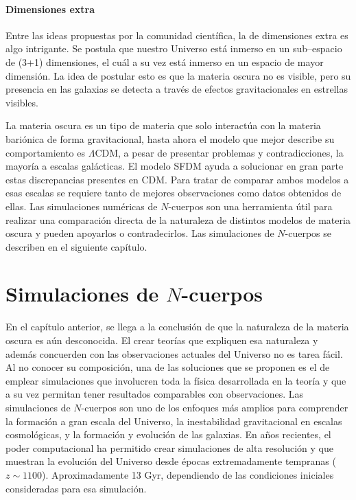 \documentclass[a4paper,openright,12pt]{book}
\begin{document}
\subsubsection*{Dimensiones extra}

Entre las ideas propuestas por la comunidad científica, la de dimensiones extra es algo intrigante. Se postula que nuestro Universo está inmerso en un sub--espacio de (3+1) dimensiones, el cuál a su vez está inmerso en un espacio de mayor dimensión. La idea de postular esto es que la materia oscura no es visible, pero su presencia en las galaxias se detecta a través de efectos gravitacionales en estrellas visibles.

La materia oscura es un tipo de materia que solo interactúa con la materia bariónica de forma gravitacional, hasta ahora el modelo que mejor describe su comportamiento es $\Lambda$CDM, a pesar de presentar problemas y contradicciones, la mayoría a escalas galácticas. El modelo SFDM ayuda a solucionar en gran parte estas discrepancias presentes en CDM. Para tratar de comparar ambos modelos a esas escalas se requiere tanto de mejores observaciones como datos obtenidos de ellas. Las simulaciones numéricas de $N$-cuerpos son una herramienta útil para realizar una comparación directa de la naturaleza de distintos modelos de materia oscura y pueden apoyarlos o contradecirlos. Las simulaciones de $N$-cuerpos se describen en el siguiente capítulo.




\chapter{Simulaciones de $N$-cuerpos}\label{cap.nudo}
En el capítulo anterior, se llega a la conclusión de que la naturaleza de la materia oscura es aún desconocida. El crear teorías que expliquen esa naturaleza y además concuerden con las observaciones actuales del Universo no es tarea fácil. Al no conocer su composición, una de las soluciones que se proponen es el de emplear simulaciones que involucren toda la física desarrollada en la teoría y que a su vez permitan tener resultados comparables con observaciones. Las simulaciones de $N$-cuerpos son uno de los enfoques más amplios para comprender la formación a gran escala del Universo, la inestabilidad gravitacional en escalas cosmológicas, y la formación y evolución de las galaxias. En años recientes, el poder computacional ha permitido crear simulaciones de alta resolución y que muestran la evolución del Universo desde épocas extremadamente tempranas ($z \sim 1100$). Aproximadamente 13 Gyr, dependiendo de las condiciones iniciales consideradas para esa simulación.
\end{document}
